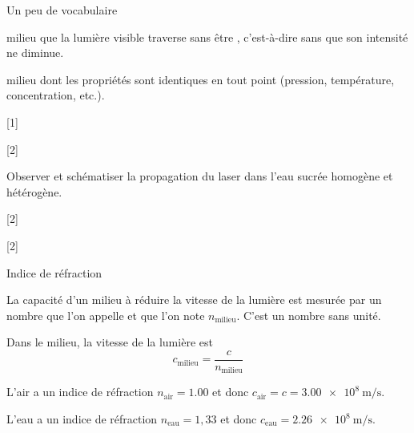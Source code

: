 \begin{doc}{Un peu de vocabulaire}
  \begin{importants}
     milieu que la lumière visible traverse sans être , c'est-à-dire sans que son intensité ne diminue.
  \end{importants}
  \begin{importants}
     milieu dont les propriétés sont identiques en tout point (pression, température, concentration, etc.).
  \end{importants}
\end{doc}

[1]

[2]


\pasCorrection{\newpage\vspace*{-32pt}}
\schematisation Observer et schématiser la propagation du laser dans l'eau sucrée homogène et hétérogène.
\vspace{4cm}

[2]

[2]

\begin{doc}{Indice de réfraction}
  \begin{importants}
    La capacité d'un milieu à réduire la vitesse de la lumière est mesurée par un nombre que l'on appelle  et que l'on note $n_\text{milieu}$.
    C'est un nombre sans unité.
    
    Dans le milieu, la vitesse de la lumière est
    \begin{equation*}
      c_\text{milieu} = \dfrac{c}{n_\text{milieu}}
    \end{equation*}
  \end{importants}
  
  \exemple*
  \begin{listePoints}
    \item L'air a un indice de réfraction $n_\text{air} = \num{1,00}$ et donc $c_\text{air} = c = \qty{3,00e8}{\m\per\s}$.
    \item L'eau a un indice de réfraction $n_\text{eau} = 1,\!33$ et donc $c_\text{eau} = \qty{2,26e8}{\m\per\s}$.
  \end{listePoints}
\end{doc}


